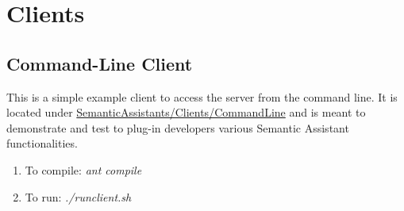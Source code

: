 

   
 

\chapter{\sa Clients}\label{chap:clients}

\section{Command-Line Client}
\label{sec:sacl:clc}
This is a simple example client to access the server from the command line.
It is located under \url{SemanticAssistants/Clients/CommandLine} and is meant to demonstrate and test to plug-in developers various Semantic Assistant functionalities.

\begin{enumerate}
\item To compile: \emph{ant compile}
\item To run: \emph{./runclient.sh}
\end{enumerate}

